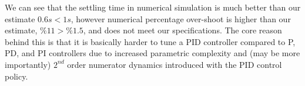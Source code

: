 \documentclass[twoside]{article}
\begin{document}
\vspace{12 pt}

We can see that the settling time in numerical simulation
is much better than our estimate $0.6 s < 1 s$, however
numerical percentage over-shoot is higher than our estimate, 
$\% 11 > \% 1.5$, and does not meet our specifications. 
The core reason behind this is that it is basically harder to
tune a PID controller compared to P, PD, and PI controllers
due to increased parametric complexity and (may be more importantly)
$2^{nd}$ order numerator dynamics introduced with the PID control 
policy.




\end{document}
